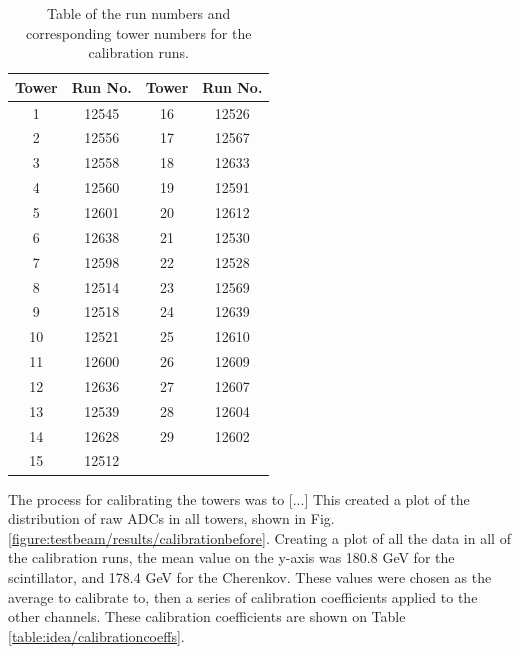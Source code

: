 \begin{table}[h]
\centering
	\begin{tabular}{ c c | c c }
	\hline \hline
	\textbf{Tower} & \textbf{Run No.} & \textbf{Tower} & \textbf{Run No.} \\ \hline \hline
	 1 & 12545 & 16 & 12526 \\
	 2 & 12556 & 17 & 12567 \\
	 3 & 12558 & 18 & 12633 \\
	 4 & 12560 & 19 & 12591 \\
	 5 & 12601 & 20 & 12612 \\
	 6 & 12638 & 21 & 12530 \\
	 7 & 12598 & 22 & 12528 \\
	 8 & 12514 & 23 & 12569 \\
	 9 & 12518 & 24 & 12639 \\
	10 & 12521 & 25 & 12610 \\
	11 & 12600 & 26 & 12609 \\
	12 & 12636 & 27 & 12607 \\
	13 & 12539 & 28 & 12604 \\
	14 & 12628 & 29 & 12602 \\
	15 & 12512 &    &    \\ \hline
	\end{tabular}
	\caption{Table of the run numbers and corresponding tower numbers for the calibration runs.}
	\label{table:idea/calibrationruns}
\end{table}

The process for calibrating the towers was to [...] This created a plot of the distribution of raw ADCs in all towers, shown in Fig. \ref{figure:testbeam/results/calibrationbefore}. Creating a plot of all the data in all of the calibration runs, the mean value on the y-axis was 180.8 GeV for the scintillator, and 178.4 GeV for the Cherenkov. These values were chosen as the average to calibrate to, then a series of calibration coefficients applied to the other channels. These calibration coefficients are shown on Table \ref{table:idea/calibrationcoeffs}.

